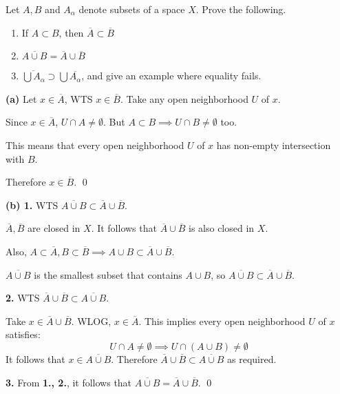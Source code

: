 \documentclass[a4paper, 12pt]{article}
\begin{document}
\begin{problem} 
Let $A, B$ and $A_\alpha$ denote subsets of a space $X$. Prove the following.
\begin{enumerate}
\item If $A \subset B$, then $\overline{A} \subset \overline{B}$
\item $\overline{A \cup B} = \overline{A} \cup \overline{B}$
\item $\overline{\bigcup A_\alpha} \supset \bigcup \overline{A_\alpha}$, and give an example where equality fails.
\end{enumerate}
\end{problem}
\begin{solution}
    \textbf{(a)} Let $x \in \overline{A}$, WTS $x \in \overline{B}$. Take any open neighborhood $U$ of $x$.

    Since $x \in \overline{A}$, $U \cap A \neq \emptyset$. But $A \subset B \implies U \cap B \neq \emptyset$ too.

    This means that every open neighborhood $U$ of $x$ has non-empty intersection with $B$.

    Therefore $x \in \overline{B}$. \qed

    \textbf{(b) 1.} WTS $\overline{A \cup B} \subset \overline{A} \cup \overline{B}$.

    $\overline{A}, \overline{B}$ are closed in $X$. It follows that $\overline{A} \cup \overline{B}$ is also closed in $X$.

    Also, $A \subset \overline{A}, B \subset \overline{B} \implies A \cup B \subset \overline{A} \cup \overline{B}$.

    $\overline{A \cup B}$ is the smallest subset that contains $A \cup B$, so $\overline{A \cup B} \subset \overline{A} \cup \overline{B}$.

    \textbf{2.} WTS $\overline{A} \cup \overline{B} \subset \overline{A \cup B}$.

    Take $x \in \overline{A} \cup \overline{B}$. WLOG, $x \in \overline{A}$. This implies every open neighborhood $U$ of $x$ satisfies:\begin{equation*}
    U \cap A  \neq \emptyset \implies U \cap (A \cup B) \neq \emptyset
    \end{equation*}
    It follows that $x \in \overline{A \cup B}$. Therefore $\overline{A} \cup \overline{B} \subset \overline{A \cup B}$ as required.

    \textbf{3.} From \textbf{1., 2.}, it follows that $\overline{A \cup B} = \overline{A} \cup \overline{B}$. \qed


\end{solution}
\end{document}
